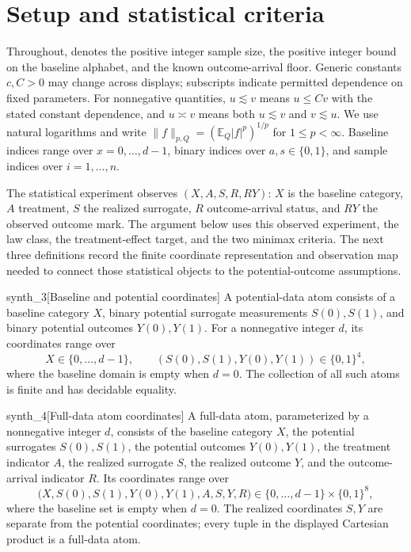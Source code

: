 \section{Setup and statistical criteria}

Throughout,  denotes the positive integer sample size,  the positive integer bound on the baseline alphabet, and  the known outcome-arrival floor. Generic constants \(c,C>0\) may change across displays; subscripts indicate permitted dependence on fixed parameters. For nonnegative quantities, \(u\lesssim v\) means \(u\le Cv\) with the stated constant dependence, and \(u\asymp v\) means both \(u\lesssim v\) and \(v\lesssim u\). We use natural logarithms and write \(\|f\|_{p,Q}=(\mathbb E_Q|f|^p)^{1/p}\) for \(1\le p<\infty\). Baseline indices range over \(x=0,\ldots,d-1\), binary indices over \(a,s\in\{0,1\}\), and sample indices over \(i=1,\ldots,n\).

The statistical experiment observes \((X,A,S,R,RY)\): \(X\) is the baseline category, \(A\) treatment, \(S\) the realized surrogate, \(R\) outcome-arrival status, and \(RY\) the observed outcome mark. The argument below uses this observed experiment, the law class, the treatment-effect target, and the two minimax criteria. The next three definitions record the finite coordinate representation and observation map needed to connect those statistical objects to the potential-outcome assumptions.

\begin{definitionv}{synth_3}[Baseline and potential coordinates]
A potential-data atom consists of a baseline category \(X\), binary potential surrogate measurements \(S(0),S(1)\), and binary potential outcomes \(Y(0),Y(1)\). For a nonnegative integer \(d\), its coordinates range over
\[
X\in\{0,\ldots,d-1\},
\qquad
(S(0),S(1),Y(0),Y(1))\in\{0,1\}^{4},
\]
where the baseline domain is empty when \(d=0\). The collection of all such atoms is finite and has decidable equality.
\end{definitionv}

\begin{definitionv}{synth_4}[Full-data atom coordinates]
A full-data atom, parameterized by a nonnegative integer \(d\), consists of the baseline category \(X\), the potential surrogates \(S(0),S(1)\), the potential outcomes \(Y(0),Y(1)\), the treatment indicator \(A\), the realized surrogate \(S\), the realized outcome \(Y\), and the outcome-arrival indicator \(R\). Its coordinates range over
\[
\bigl(X,S(0),S(1),Y(0),Y(1),A,S,Y,R\bigr)
\in \{0,\ldots,d-1\}\times\{0,1\}^{8},
\]
where the baseline set is empty when \(d=0\). The realized coordinates \(S,Y\) are separate from the potential coordinates; every tuple in the displayed Cartesian product is a full-data atom.
\end{definitionv}

